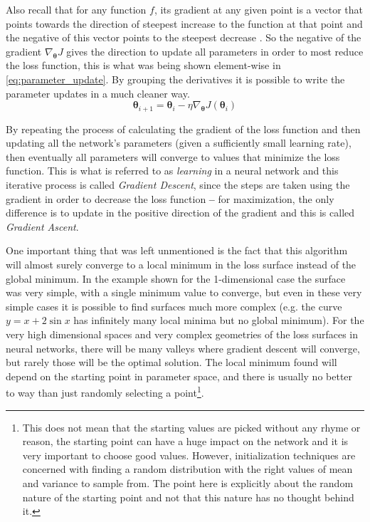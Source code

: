 Also recall that for any function $f$, its gradient at any given point is a vector that points towards the direction of steepest increase to the function at that point and the negative of this vector points to the steepest decrease \cite[Chapter~4.6]{calculusIII2016}. So the negative of the gradient $\nabla_{\bm{\theta}} J$ gives the direction to update all parameters in order to most reduce the loss function, this is what was being shown element-wise in \autoref{eq:parameter_update}. By grouping the derivatives it is possible to write the parameter updates in a much cleaner way.
\begin{equation} \label{eq:gradient_descent}
    \bm{\theta}_{i+1} = \bm{\theta}_{i} - \eta \nabla_{\bm{\theta}} J(\bm{\theta}_i)
\end{equation}

By repeating the process of calculating the gradient of the loss function and then updating all the network's parameters (given a sufficiently small learning rate), then eventually all parameters will converge to values that minimize the loss function. This is what is referred to as \textit{learning} in a neural network and this iterative process is called \textit{Gradient Descent}, since the steps are taken using the gradient in order to decrease the loss function \textbf{--} for maximization, the only difference is to update in the positive direction of the gradient and this is called \textit{Gradient Ascent}.

One important thing that was left unmentioned is the fact that this algorithm will almost surely converge to a local minimum in the loss surface instead of the global minimum. In the example shown for the 1-dimensional case the surface was very simple, with a single minimum value to converge, but even in these very simple cases it is possible to find surfaces much more complex (e.g. the curve $y = x + 2\sin x$ has infinitely many local minima but no global minimum). For the very high dimensional spaces and very complex geometries of the loss surfaces in neural networks, there will be many valleys where gradient descent will converge, but rarely those will be the optimal solution. The local minimum found will depend on the starting point in parameter space, and there is usually no better to way than just randomly selecting a point\footnote{
    This does not mean that the starting values are picked without any rhyme or reason, the starting point can have a huge impact on the network and it is very important to choose good values. However, initialization techniques are concerned with finding a random distribution with the right values of mean and variance to sample from. The point here is explicitly about the random nature of the starting point and not that this nature has no thought behind it.
}.

